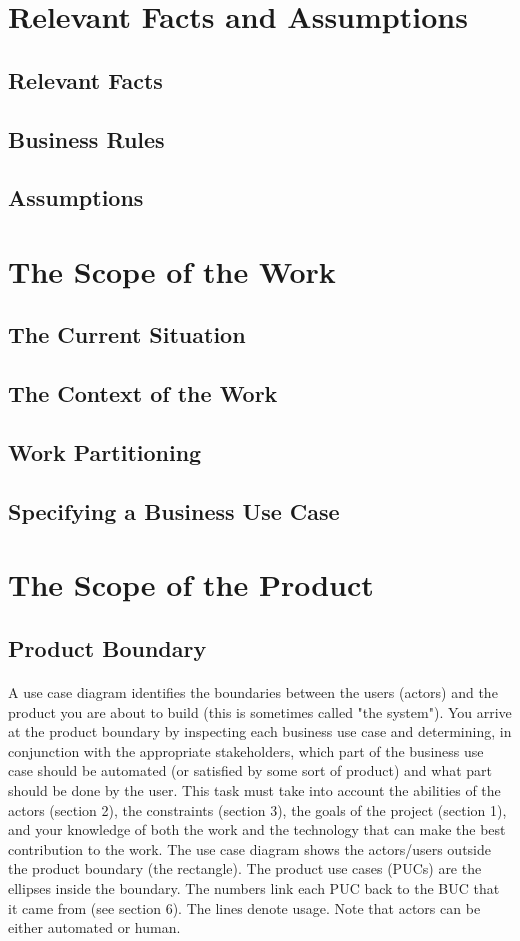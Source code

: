 \documentclass[12pt,a4paper]{article}
\begin{document}
\section{Relevant Facts and Assumptions}
\subsection{Relevant Facts}
\subsection{Business Rules}
\subsection{Assumptions}
\pagebreak
\section{The Scope of the Work}
\subsection{The Current Situation}
\subsection{The Context of the Work}
\subsection{Work Partitioning}
\subsection{Specifying a Business Use Case}
\pagebreak
\section{The Scope of the Product}
\subsection{Product Boundary}
\paragraph{}
A use case diagram identifies the boundaries between the users (actors) and the product you are about to build (this is sometimes called "the system"). You arrive at the product boundary by inspecting each business use case and determining, in conjunction with the appropriate stakeholders, which part of the business use case should be automated (or satisfied by some sort of product) and what part should be done by the user. This task must take into account the abilities of the actors (section 2), the constraints (section 3), the goals of the project (section 1), and your knowledge of both the work and the technology that can make the best contribution to the work.
The use case diagram shows the actors/users outside the product boundary (the rectangle). The product use cases (PUCs) are the ellipses inside the boundary. The numbers link each PUC back to the BUC that it came from (see section 6). The lines denote usage. Note that actors can be either automated or human.
\end{document}
